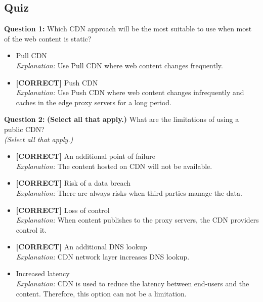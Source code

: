 

\subsection*{Quiz}
\vspace{0.3cm}
\noindent
\textbf{Question 1:} Which CDN approach will be the most suitable to use when most of the web content is static?
\\[0.2cm]
\begin{itemize}
 \item Pull CDN
\\[0.1cm]
\textit{Explanation:} 
Use Pull CDN where web content changes frequently.
 \item \textbf{[CORRECT]} Push CDN
\\[0.1cm]
\textit{Explanation:} 
Use Push CDN where web content changes infrequently and caches in the edge proxy servers for a long period.
\end{itemize}
\vspace{0.3cm}
\noindent
\textbf{Question 2:} \textbf{(Select all that apply.)} What are the limitations of using a public CDN?
\\
\textit{(Select all that apply.)}
\\[0.2cm]
\begin{itemize}
 \item \textbf{[CORRECT]} An additional point of failure
\\[0.1cm]
\textit{Explanation:} 
The content hosted on CDN will not be available.
 \item \textbf{[CORRECT]} Risk of a data breach
\\[0.1cm]
\textit{Explanation:} 
There are always risks when third parties manage the data.
 \item \textbf{[CORRECT]} Loss of control
\\[0.1cm]
\textit{Explanation:} 
When content publishes to the proxy servers, the CDN providers control it.
 \item \textbf{[CORRECT]} An additional DNS lookup
\\[0.1cm]
\textit{Explanation:} 
CDN network layer increases DNS lookup.
 \item Increased latency
\\[0.1cm]
\textit{Explanation:} 
CDN is used to reduce the latency between end-users and the content. Therefore, this option can not be a limitation.
\end{itemize}

